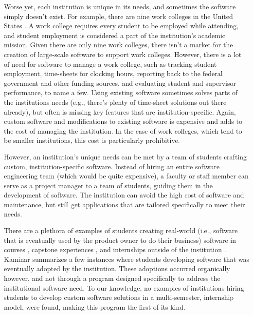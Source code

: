 Worse yet, each institution is unique in its needs, and sometimes the software simply doesn't exist. For example, there are nine work colleges in the United States \cite{WCCMembers, Ecclesia}. A work college requires every student to be employed while attending, and student employment is considered a part of the institution's academic mission. Given there are only nine work colleges, there isn't a market for the creation of large-scale software to support work colleges. However, there is a lot of need for software to manage a work college, such as tracking student employment, time-sheets for clocking hours, reporting back to the federal government and other funding sources, and evaluating student and supervisor performance, to name a few. Using existing software sometimes solves parts of the institutions needs (e.g., there's plenty of time-sheet solutions out there already), but often is missing key features that are institution-specific. Again, custom software and modifications to existing software is expensive and adds to the cost of managing the institution. In the case of work colleges, which tend to be smaller institutions, this cost is particularly prohibitive. 

However, an institution's unique needs can be met by a team of students crafting custom, institution-specific software. Instead of hiring an entire software engineering team (which would be quite expensive), a faculty or staff member can serve as a project manager to a team of students, guiding them in the development of software. The institution can avoid the high cost of software and maintenance, but still get applications that are tailored specifically to meet their needs. 



There are a plethora of examples of students creating real-world (i.e., software that is eventually used by the product owner to do their business) software in courses \cite{coursevsproject, tadayon2004software}, capstone experiences \cite{keogh2007scalable, capstone}, and internships outside of the institution \cite{rochesterfirstundergradsoftwareteam}. Kaminar \cite{kaminer_2014} summarizes a few instances where students developing software that was eventually adopted by the institution. These adoptions occurred organically however, and not through a program designed specifically to address the institutional software need. To our knowledge, no examples of institutions hiring students to develop custom software solutions in a multi-semester, internship model, were found, making this program the first of its kind. 

